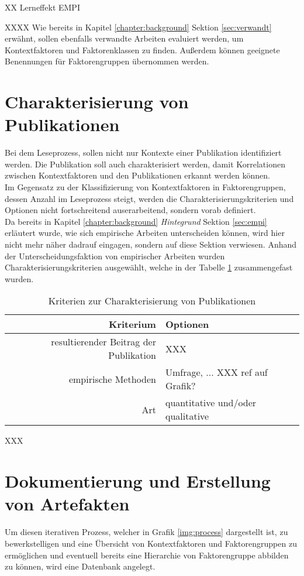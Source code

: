 XX Lerneffekt EMPI

XXXX
Wie bereits in Kapitel \ref{chapter:background} Sektion \ref{sec:verwandt} erwähnt, sollen ebenfalls verwandte Arbeiten evaluiert werden, um Kontextfaktoren und Faktorenklassen zu finden. Außerdem können geeignete Benennungen für Faktorengruppen  übernommen werden.


\section{Charakterisierung von Publikationen}
\label{sec:character}

Bei dem Leseprozess, sollen nicht nur Kontexte einer Publikation identifiziert werden. Die Publikation soll auch charakterisiert werden, damit Korrelationen zwischen Kontextfaktoren und den Publikationen erkannt werden können. \\

Im Gegensatz zu der Klassifizierung von Kontextfaktoren in Faktorengruppen, dessen Anzahl im Leseprozess steigt, werden die Charakterisierungskriterien und Optionen nicht fortschreitend auserarbeitend, sondern vorab definiert. \\
Da bereits in Kapitel \ref{chapter:background} \textit{Hintegrund} Sektion \ref{sec:empi} erläutert wurde, wie sich empirische Arbeiten unterscheiden können, wird hier nicht mehr näher dadrauf eingagen, sondern auf diese Sektion verwiesen. Anhand der Unterscheidungsfaktion von empirischer Arbeiten wurden Charakterisierungskriterien ausgewählt, welche in der Tabelle \ref{table:character} zusammengefast wurden. \\

\begin{table}[h!]
\begin{tabular}{ r | l }
 Kriterium & Optionen \\ 
  \hline
  resultierender Beitrag der Publikation & XXX \\  
  empirische Methoden & Umfrage, ... XXX ref auf Grafik? \\
  Art & quantitative und/oder qualitative \\
\end{tabular}
\caption{Kriterien zur Charakterisierung von Publikationen}
\label{table:character}
\end{table}

XXX 


\section{Dokumentierung und Erstellung von Artefakten}
Um diesen iterativen Prozess, welcher in Grafik \ref{img:process} dargestellt ist, zu bewerkstelligen und eine Übersicht von Kontextfaktoren und Faktorengruppen zu ermöglichen und eventuell bereits eine Hierarchie von Faktorengruppe abbilden zu können, wird eine Datenbank angelegt. \\

